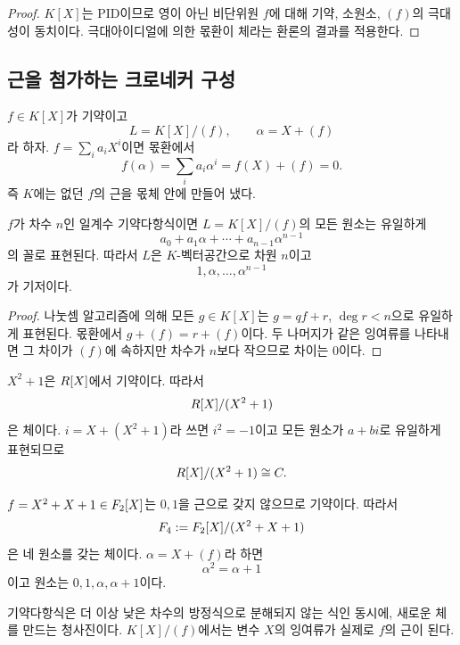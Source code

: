 \begin{proof}
$K[X]$는 PID이므로 영이 아닌 비단위원 $f$에 대해 기약, 소원소, $(f)$의 극대성이 동치이다. 극대아이디얼에 의한 몫환이 체라는 환론의 결과를 적용한다.
\end{proof}

\subsection{근을 첨가하는 크로네커 구성}

$f\in K[X]$가 기약이고
\[
  L=K[X]/(f),\qquad \alpha=X+(f)
\]
라 하자. $f=\sum_i a_iX^i$이면 몫환에서
\[
  f(\alpha)=\sum_i a_i\alpha^i
  =f(X)+(f)=0.
\]
즉 $K$에는 없던 $f$의 근을 몫체 안에 만들어 냈다.

\begin{proposition}
$f$가 차수 $n$인 일계수 기약다항식이면 $L=K[X]/(f)$의 모든 원소는 유일하게
\[
  a_0+a_1\alpha+\cdots+a_{n-1}\alpha^{n-1}
\]
의 꼴로 표현된다. 따라서 $L$은 $K$-벡터공간으로 차원 $n$이고
\[
  1,\alpha,\dots,\alpha^{n-1}
\]
가 기저이다.
\end{proposition}

\begin{proof}
나눗셈 알고리즘에 의해 모든 $g\in K[X]$는 $g=qf+r$, $\deg r<n$으로 유일하게 표현된다. 몫환에서 $g+(f)=r+(f)$이다. 두 나머지가 같은 잉여류를 나타내면 그 차이가 $(f)$에 속하지만 차수가 $n$보다 작으므로 차이는 $0$이다.
\end{proof}

\begin{example}
$X^2+1$은 $R[X]$에서 기약이다. 따라서
\[
  R[X]/(X^2+1)
\]
은 체이다. $i=X+(X^2+1)$라 쓰면 $i^2=-1$이고 모든 원소가 $a+bi$로 유일하게 표현되므로
\[
  R[X]/(X^2+1)\cong C.
\]
\end{example}

\begin{example}
$f=X^2+X+1\in F_2[X]$는 $0,1$을 근으로 갖지 않으므로 기약이다. 따라서
\[
  F_4:=F_2[X]/(X^2+X+1)
\]
은 네 원소를 갖는 체이다. $\alpha=X+(f)$라 하면
\[
  \alpha^2=\alpha+1
\]
이고 원소는 $0,1,\alpha,\alpha+1$이다.
\end{example}

\begin{keyidea}
기약다항식은 더 이상 낮은 차수의 방정식으로 분해되지 않는 식인 동시에, 새로운 체를 만드는 청사진이다. $K[X]/(f)$에서는 변수 $X$의 잉여류가 실제로 $f$의 근이 된다.
\end{keyidea}

